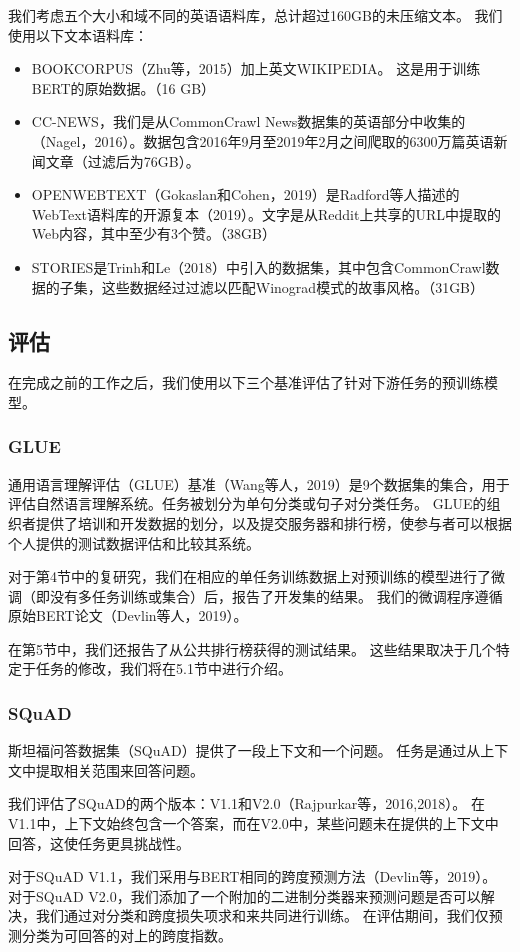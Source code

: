 \documentclass[lang=cn,11pt,a4paper,twocolumn]{elegantpaper}
\begin{document}
我们考虑五个大小和域不同的英语语料库，总计超过160GB的未压缩文本。 我们使用以下文本语料库：
\begin{itemize}
  \item BOOKCORPUS（Zhu等，2015）加上英文WIKIPEDIA。 这是用于训练BERT的原始数据。（16 GB）
  \item CC-NEWS，我们是从CommonCrawl News数据集的英语部分中收集的（Nagel，2016）。数据包含2016年9月至2019年2月之间爬取的6300万篇英语新闻文章（过滤后为76GB）。
  \item OPENWEBTEXT（Gokaslan和Cohen，2019）是Radford等人描述的WebText语料库的开源复本（2019）。文字是从Reddit上共享的URL中提取的Web内容，其中至少有3个赞。（38GB）
  \item STORIES是Trinh和Le（2018）中引入的数据集，其中包含CommonCrawl数据的子集，这些数据经过过滤以匹配Winograd模式的故事风格。（31GB）
\end{itemize}

\subsection{评估}
在完成之前的工作之后，我们使用以下三个基准评估了针对下游任务的预训练模型。
\subsubsection{GLUE}
通用语言理解评估（GLUE）基准（Wang等人，2019）是9个数据集的集合，用于评估自然语言理解系统。任务被划分为单句分类或句子对分类任务。 GLUE的组织者提供了培训和开发数据的划分，以及提交服务器和排行榜，使参与者可以根据个人提供的测试数据评估和比较其系统。

对于第4节中的复研究，我们在相应的单任务训练数据上对预训练的模型进行了微调（即没有多任务训练或集合）后，报告了开发集的结果。 我们的微调程序遵循原始BERT论文（Devlin等人，2019）。

在第5节中，我们还报告了从公共排行榜获得的测试结果。 这些结果取决于几个特定于任务的修改，我们将在5.1节中进行介绍。
\subsubsection{SQuAD}
斯坦福问答数据集（SQuAD）提供了一段上下文和一个问题。 任务是通过从上下文中提取相关范围来回答问题。

我们评估了SQuAD的两个版本：V1.1和V2.0（Rajpurkar等，2016,2018）。 在V1.1中，上下文始终包含一个答案，而在V2.0中，某些问题未在提供的上下文中回答，这使任务更具挑战性。

对于SQuAD V1.1，我们采用与BERT相同的跨度预测方法（Devlin等，2019）。 对于SQuAD V2.0，我们添加了一个附加的二进制分类器来预测问题是否可以解决，我们通过对分类和跨度损失项求和来共同进行训练。 在评估期间，我们仅预测分类为可回答的对上的跨度指数。
\end{document}
